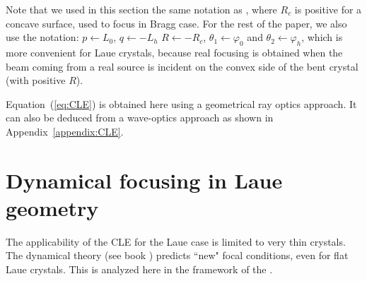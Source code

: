 \documentclass[preprint]{iucr}              %
\newcommand{\inred}[1]{{\color{red}#1}}
\begin{document}
Note that we used in this section the same notation as \cite{CK}, where $R_c$ is positive for a concave surface, used to focus in Bragg case. For the rest of the paper, we \inred{also use} the notation: $p \leftarrow L_0$, $q \leftarrow -L_h$ $R \leftarrow -R_c$, $\theta_1 \leftarrow \varphi_0$ and $\theta_2 \leftarrow \varphi_h$\inred{, which is more convenient} for Laue crystals, because real focusing is obtained when the beam coming from a real source is incident on the convex side of the bent crystal (with positive $R$).

Equation~(\ref{eq:CLE}) is obtained here using a geometrical ray optics approach. It can also be deduced from a wave-optics approach as shown in Appendix~\ref{appendix:CLE}.

\section{Dynamical focusing in Laue geometry}
\label{sec:dynamlicalLaue}

The \inred{applicability} of the CLE for the Laue case is \inred{limited to very thin crystals}. The dynamical theory \inred{(see book \cite{authierbook})}
predicts ``new" focal conditions, even for flat Laue crystals.
\inred{This is} analyzed here in the framework of the  \inred{\cite{Takagi1962, Takagi, Taupin, Taupin1967}}. 
\end{document}
